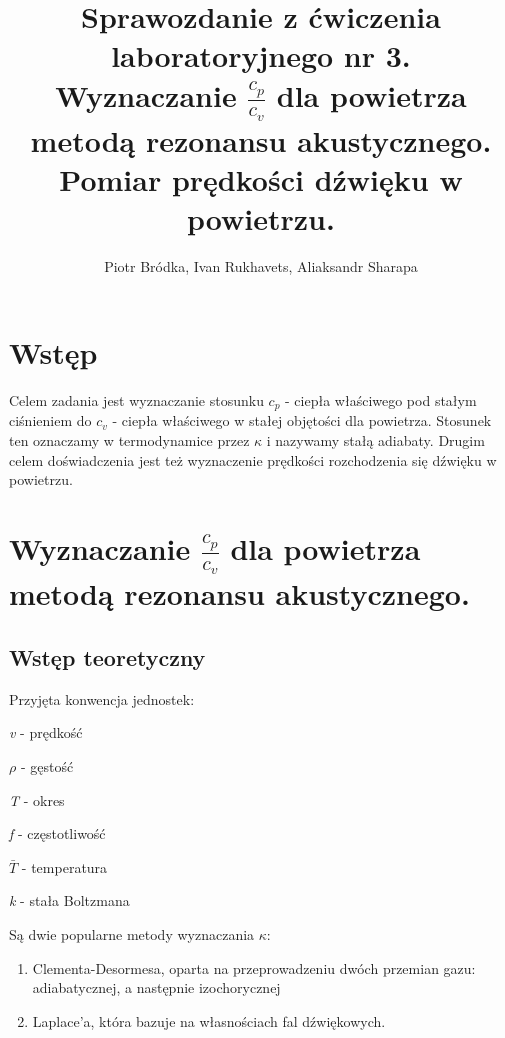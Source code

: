\documentclass[12pt,a4paper]{article}
\begin{document}
\begin{titlepage}


\title{%
Sprawozdanie z ćwiczenia laboratoryjnego nr 3.\\
\large  Wyznaczanie $\frac{c_p}{c_v}$ dla powietrza metodą rezonansu akustycznego. Pomiar prędkości dźwięku w powietrzu.}

\author{Piotr Bródka, Ivan Rukhavets, Aliaksandr Sharapa}


\maketitle
\end{titlepage}

\section{Wstęp}
Celem zadania jest wyznaczanie stosunku $c_p$ - ciepła właściwego pod stałym ciśnieniem do $c_v$ - ciepła właściwego w stałej objętości dla powietrza. Stosunek ten oznaczamy w termodynamice przez $\kappa$ i nazywamy stałą adiabaty.
Drugim celem doświadczenia jest też wyznaczenie prędkości rozchodzenia się dźwięku w powietrzu.


\section{Wyznaczanie $\frac{c_p}{c_v}$ dla powietrza metodą rezonansu akustycznego.} 

\subsection{Wstęp teoretyczny}
Przyjęta konwencja jednostek:
\begin{center}

\textit{v} - prędkość

$\rho$ - gęstość


\textit{T} - okres


\textit{f} - częstotliwość


$\bar{T}$ - temperatura


\textit{k} - stała Boltzmana


\end{center}



Są dwie popularne metody wyznaczania $\kappa$:
\begin{enumerate}
\item Clementa-Desormesa, oparta na przeprowadzeniu dwóch przemian gazu: adiabatycznej, a następnie izochorycznej \item Laplace'a, która bazuje na własnościach fal dźwiękowych. 
\end{enumerate} 
\end{document}
